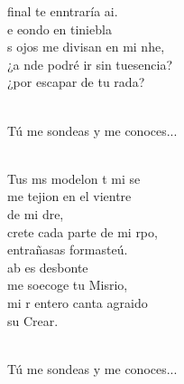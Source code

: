 \documentclass[12pt]{article}
\begin{document}
\begin{multicols*}{2}
\begin{cancion}
	final te enntraría ai. \\
\jump
	e eondo en tiniebla \\
	s ojos me divisan en mi nhe, \\
	¿a nde podré ir sin tuesencia?  \\
	¿por escapar de tu rada?  \\\jump\\
	\begin{chorus}%
Tú me sondeas y me conoces... \\
	\end{chorus}%
	\jump\\
	Tus ms modelon t mi se\\
	me tejion en el vientre\\
	de mi dre, \\
	crete cada parte de mi rpo, \\
	 entrañasas formasteú. \\
\jump
	ab es desbonte \\
	me soecoge tu Misrio, \\
	mi r entero canta agraido \\
	 su Crear. \\\jump\\
	\begin{chorus}%
Tú me sondeas y me conoces... \\
	\end{chorus}%
	\jump\\
\end{cancion}%


\end{multicols*}
\end{document}
